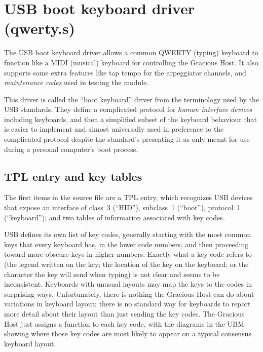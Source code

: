 
%
%
%
%
%
%

\chapter{USB boot keyboard driver (qwerty.s)}

The USB boot keyboard driver allows a common QWERTY (typing) keyboard to
function like a MIDI (musical) keyboard for controlling the Gracious Host. 
It also supports some extra features like tap tempo for the arpeggiator
channels, and \emph{maintenance codes} used in testing the module.

This driver is called the ``boot keyboard'' driver from the terminology used
by the USB standards.  They define a complicated protocol for \emph{human
interface devices} including keyboards, and then a simplified subset of the
keyboard behaviour that is easier to implement and almost universally used
in preference to the complicated protocol despite the standard's presenting
it as only meant for use during a personal computer's boot process.

\section{TPL entry and key tables}

The first items in the source file are a TPL entry, which recognizes USB
devices that expose an interface of class~3 (``HID''), subclass~1
(``boot''), protocol~1 (``keyboard''); and two tables of information
associated with key codes.

USB defines its own list of key codes, generally starting with the most
common keys that every keyboard has, in the lower code numbers, and then
proceeding toward more obscure keys in higher numbers.  Exactly what a key
code refers to (the legend written on the key; the location of the key on
the keyboard; or the character the key will send when typing) is not clear
and seems to be inconsistent.  Keyboards with unusual layouts may map the
keys to the codes in surprising ways.  Unfortunately, there is nothing the
Gracious Host can do about variations in keyboard layout; there is no
standard way for keyboards to report more detail about their layout than
just sending the key codes.  The Gracious Host just assigns a function to
each key code, with the diagrams in the UBM showing where those key codes
are most likely to appear on a typical consensus keyboard layout.

